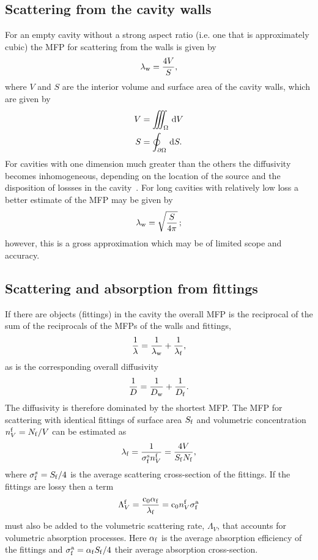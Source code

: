 \documentclass[a4paper]{article}
\numberwithin{equation}{section}
\providecommand\oiint{\oint}
\begin{document}
\subsection[Scattering from the cavity walls]{Scattering from the cavity walls}
\label{sc:sum:walls}

For an empty cavity without a strong aspect ratio (i.e. one that is approximately cubic) 
the MFP for scattering from the walls is given by~\citep{Navarro2015}
\begin{align}
\lambda_{\mathrm{w}} = \frac{4V}{S},
\end{align}
where $V$ and $S$ are the interior volume and surface area of the cavity
walls, which are given by
\begin{align}
V &= \iiint_{\Omega }\dif{V} \\
S &= \oiint_{\partial\Omega }\dif{S} .
\end{align}
For cavities with one dimension much greater than the others the diffusivity becomes inhomogeneous, 
depending on the location of the source and the disposition of lossses in the cavity~\citep{Visentin2012,Visentin2015}.
For long cavities with relatively low loss a better estimate of the MFP may be given by
\begin{align}
\lambda_{\mathrm{w}} = \sqrt{\frac{S}{4\pi}}\,;
\end{align}
however, this is a gross approximation which may be of limited scope and accuracy.

\subsection[Scattering and absorption from fittings]{Scattering and absorption from fittings}
\label{sc:sum:fit}

If there are objects (fittings) in the cavity the overall MFP is the reciprocal of the 
sum of the reciprocals of the MFPs of the walls and fittings,
\begin{align}
\label{eq:harmmean}
\frac{1}{\lambda} = \frac{1}{\lambda_{\mathrm{w}}} + \frac{1}{\lambda_{\mathrm{f}}},
\end{align}
as is the corresponding overall diffusivity~\citep{Valeau2007}
\begin{align}
\frac{1}{D} = \frac{1}{D_{\mathrm{w}}} + \frac{1}{D_{\mathrm{f}}}.
\end{align}
The diffusivity is therefore dominated by the shortest MFP. The MFP for
scattering with identical fittings of surface area $S_{\mathrm{f}}$ and volumetric
concentration $n_V^{\mathrm{f}}=N_{\mathrm{f}}/V$ can be estimated as~\citep{Valeau2007}
\begin{align}
\lambda_{\mathrm{f}} = \frac{1}{\sigma_{\mathrm{f}}^{\mathrm{s}} n_V^{\mathrm{f}}} = \frac{4V}{S_{\mathrm{f}} N_{\mathrm{f}}},
\end{align}
where $\sigma_{\mathrm{f}}^s=S_{\mathrm{f}}/4$ is the average scattering cross-section of the
fittings. If the fittings are lossy then a term
\begin{align}
\Lambda_V^{\mathrm{f}} = \frac{\mathrm{c}_0\alpha_{\mathrm{f}}}{\lambda_{\mathrm{f}}} = \mathrm{c}_0 n_V^{\mathrm{f}} \sigma_{\mathrm{f}}^{\mathrm{a}}
\end{align}
must also be added to the volumetric scattering rate, $\Lambda_V$, that accounts
for volumetric absorption processes. Here $\alpha_{\mathrm{f}}$ is the average
absorption efficiency of the fittings and $\sigma_{\mathrm{f}}^{\mathrm{a}}=\alpha_{\mathrm{f}} S_{\mathrm{f}}/4$ their
average absorption cross-section.
\end{document}

